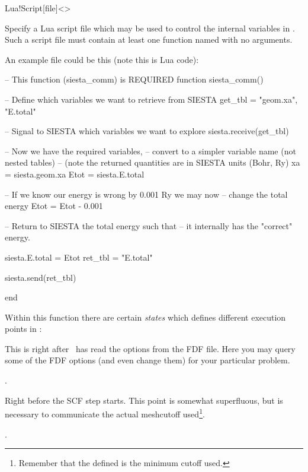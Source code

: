 \begin{fdfentry}{Lua!Script}[file]<>
  
  Specify a Lua script file which may be used to control the internal
  variables in \siesta. Such a script file must contain at least one
  function named  with no arguments.

  An example file could be this (note this is Lua code):
  \begin{codeexample}
-- This function (siesta_comm) is REQUIRED
function siesta_comm()
   
   -- Define which variables we want to retrieve from SIESTA
   get_tbl = {"geom.xa", "E.total"}

   -- Signal to SIESTA which variables we want to explore
   siesta.receive(get_tbl)

   -- Now we have the required variables,
   -- convert to a simpler variable name (not nested tables)
   -- (note the returned quantities are in SIESTA units (Bohr, Ry)
   xa = siesta.geom.xa
   Etot = siesta.E.total

   -- If we know our energy is wrong by 0.001 Ry we may now
   -- change the total energy
   Etot = Etot - 0.001

   -- Return to SIESTA the total energy such that
   -- it internally has the "correct" energy.

   siesta.E.total = Etot
   ret_tbl = {"E.total"}

   siesta.send(ret_tbl)

end
\end{codeexample}

  Within this function there are certain \emph{states} which defines
  different execution points in \siesta:
  \begin{fdfoptions}

    \option[Initialization]%
    This is right after \siesta\ has read the options from the FDF
    file. Here you may query some of the FDF options (and even change
    them) for your particular problem.

    \note {}.

    \option[Initialize-MD]%
    Right before the SCF step starts. This point is somewhat
    superfluous, but is necessary to communicate the actual meshcutoff
    used\footnote{Remember that the  defined is the
        minimum cutoff used.}.

    \note {}.


\end{fdfoptions}
\end{fdfentry}
